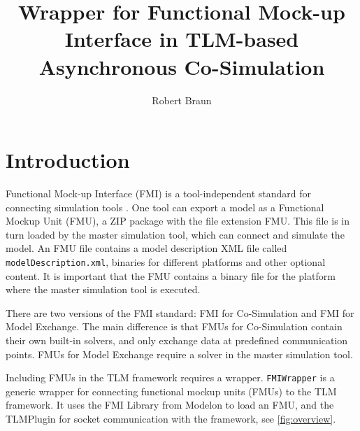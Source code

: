 \documentclass[11pt,a4paper]{report}
\begin{document}
\title{Wrapper for Functional Mock-up Interface in TLM-based Asynchronous Co-Simulation}
\author{Robert Braun}

\maketitle

\section{Introduction}
Functional Mock-up Interface (FMI) is a tool-independent standard for connecting simulation tools \cite{blochwitz2009}. 
One tool can export a model as a Functional Mockup Unit (FMU), a ZIP package with the file extension FMU. 
This file is in turn loaded by the master simulation tool, which can connect and simulate the model.
An FMU file contains a model description XML file called \texttt{modelDescription.xml}, binaries for different platforms and other optional content.
It is important that the FMU contains a binary file for the platform where the master simulation tool is executed.

There are two versions of the FMI standard: FMI for Co-Simulation and FMI for Model Exchange.
The main difference is that FMUs for Co-Simulation contain their own built-in solvers, and only exchange data at predefined communication points.
FMUs for Model Exchange require a solver in the master simulation tool.

Including FMUs in the TLM framework requires a wrapper.
\texttt{FMIWrapper} is a generic wrapper for connecting functional mockup units (FMUs) to the TLM framework.
It uses the FMI Library from Modelon \cite{modelon2015} to load an FMU, and the TLMPlugin for socket communication with the framework, see \cref{fig:overview}.
\end{document}
